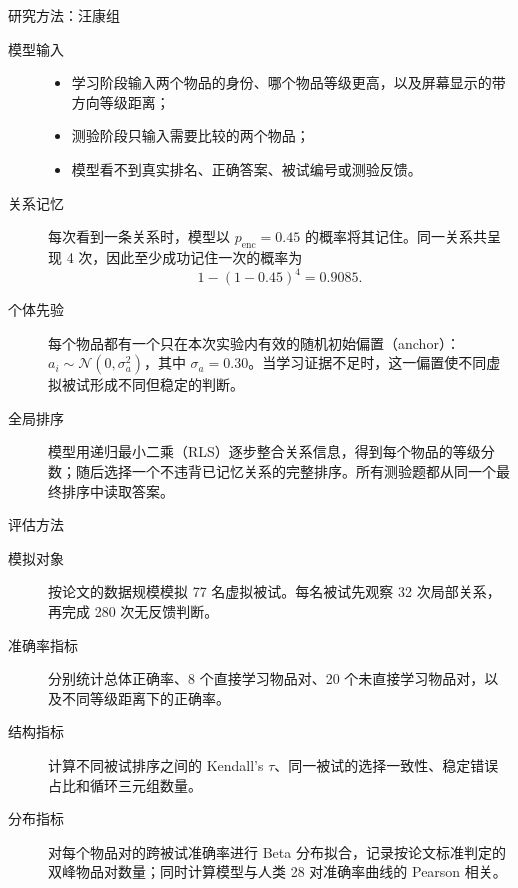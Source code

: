 \documentclass[aspectratio=169,11pt]{beamer}
\begin{document}
\begin{frame}{研究方法：汪康组}
  \small
  \begin{description}
    \item[模型输入]
      \begin{itemize}
        \item 学习阶段输入两个物品的身份、哪个物品等级更高，以及屏幕显示的带方向等级距离；
        \item 测验阶段只输入需要比较的两个物品；
        \item 模型看不到真实排名、正确答案、被试编号或测验反馈。
      \end{itemize}

    \item[关系记忆]
      每次看到一条关系时，模型以 $p_{\mathrm{enc}}=0.45$ 的概率将其记住。同一关系共呈现 4 次，因此至少成功记住一次的概率为
      \[
        1-(1-0.45)^4=0.9085.
      \]

    \item[个体先验]
      每个物品都有一个只在本次实验内有效的随机初始偏置（anchor）：
      $a_i\sim\mathcal N(0,\sigma_a^2)$，其中 $\sigma_a=0.30$。当学习证据不足时，这一偏置使不同虚拟被试形成不同但稳定的判断。

    \item[全局排序]
      模型用递归最小二乘（RLS）逐步整合关系信息，得到每个物品的等级分数；随后选择一个不违背已记忆关系的完整排序。所有测验题都从同一个最终排序中读取答案。
  \end{description}
\end{frame}

\begin{frame}{评估方法}
  \small
  \begin{description}
    \item[模拟对象]
      按论文的数据规模模拟 77 名虚拟被试。每名被试先观察 32 次局部关系，再完成 280 次无反馈判断。

    \item[准确率指标]
      分别统计总体正确率、8 个直接学习物品对、20 个未直接学习物品对，以及不同等级距离下的正确率。

    \item[结构指标]
      计算不同被试排序之间的 Kendall's $\tau$、同一被试的选择一致性、稳定错误占比和循环三元组数量。

    \item[分布指标]
      对每个物品对的跨被试准确率进行 Beta 分布拟合，记录按论文标准判定的双峰物品对数量；同时计算模型与人类 28 对准确率曲线的 Pearson 相关。
  \end{description}
\end{frame}
\end{document}
